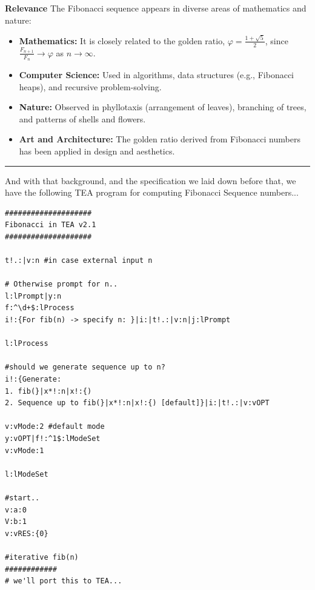 \documentclass[a4paper, 18pt]{book} %
\begin{document}
{{{\textbf{Relevance}
The Fibonacci sequence appears in diverse areas of mathematics and nature:
\begin{itemize}
    \item \textbf{Mathematics:} It is closely related to the golden ratio, \(\varphi = \frac{1+\sqrt{5}}{2}\), since \(\frac{F_{n+1}}{F_n} \to \varphi\) as \(n \to \infty\).
    \item \textbf{Computer Science:} Used in algorithms, data structures (e.g., Fibonacci heaps), and recursive problem-solving.
    \item \textbf{Nature:} Observed in phyllotaxis (arrangement of leaves), branching of trees, and patterns of shells and flowers.
    \item \textbf{Art and Architecture:} The golden ratio derived from Fibonacci numbers has been applied in design and aesthetics.
\end{itemize}

\noindent\rule{\textwidth}{0.4pt}

\vspace{2em}

And with that background, and the specification we laid down before that, we have the following TEA program for computing Fibonacci Sequence numbers...



\vspace{2em}

{
 \Large
  \begin{tcolorbox}[teaterminalstyle, title=TEA Program: Fibonacci in TEA v2.1, breakable]
  \begin{lstlisting}[language=TEA,breaklines=true,]
####################
Fibonacci in TEA v2.1
####################

t!.:|v:n #in case external input n

# Otherwise prompt for n..
l:lPrompt|y:n
f:^\d+$:lProcess
i!:{For fib(n) -> specify n: }|i:|t!.:|v:n|j:lPrompt

l:lProcess 

#should we generate sequence up to n?
i!:{Generate:
1. fib(}|x*!:n|x!:{)
2. Sequence up to fib(}|x*!:n|x!:{) [default]}|i:|t!.:|v:vOPT

v:vMode:2 #default mode
y:vOPT|f!:^1$:lModeSet
v:vMode:1 

l:lModeSet

#start..
v:a:0
V:b:1
v:vRES:{0}

#iterative fib(n)
############
# we'll port this to TEA...


\end{lstlisting}
\end{tcolorbox}}}}}
\end{document}
